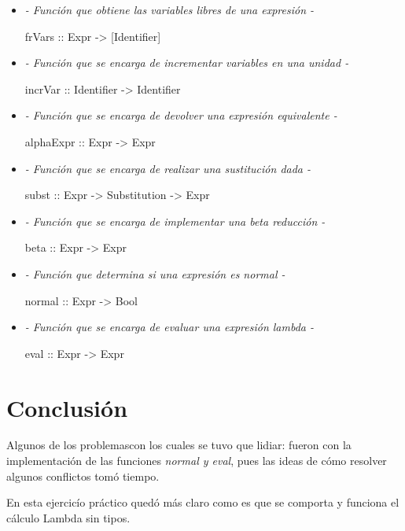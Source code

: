 \documentclass[12pt, letterpaper]{article}
\begin{document}
    \begin{itemize}

        \item[] \textit{- Función que obtiene las variables libres de una expresión -}\vspace{.1cm}
        
               frVars :: Expr -> [Identifier]

        \item[] \textit{- Función que se encarga de incrementar variables en una unidad -}\vspace{.1cm}
    
               incrVar :: Identifier -> Identifier

        \item[] \textit{- Función que se encarga de devolver una expresión equivalente -}\vspace{.1cm}
        
               alphaExpr :: Expr -> Expr

        \item[] \textit{- Función que se encarga de realizar una sustitución dada -}\vspace{.1cm}

               subst :: Expr -> Substitution -> Expr

        \item[] \textit{- Función que se encarga de implementar una beta reducción -}\vspace{.1cm}
        
               beta :: Expr -> Expr

        \item[] \textit{- Función que determina si una expresión es normal -}\vspace{.1cm}
        
               normal :: Expr -> Bool

        \item[] \textit{- Función que se encarga de evaluar una expresión lambda -} \vspace{.1cm}
    
               eval :: Expr -> Expr

    \end{itemize}

    \section*{Conclusión}
    Algunos de los problemascon los cuales se tuvo que lidiar: fueron con la
    implementación de las funciones \textit{normal y eval}, pues las ideas de cómo
    resolver algunos conflictos tomó tiempo.\vspace{.3cm}

    En esta ejercicío práctico quedó más claro como es que se comporta y funciona
    el cálculo Lambda sin tipos.
\end{document}
